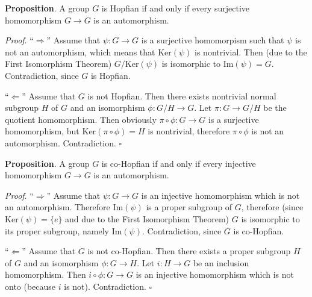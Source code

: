 \documentclass[12pt]{article}
\begin{document}
\textbf{Proposition}. A group $G$ is Hopfian if and only if every surjective homomorphism $G\to G$ is an automorphism.

\textit{Proof}. ``$\Rightarrow$'' Assume that $\psi:G\to G$ is a surjective homomorpism such that $\psi$ is not an automorphism, which means that $\mathrm{Ker}(\psi)$ is nontrivial. Then (due to the First Isomorphism Theorem) $G/\mathrm{Ker}(\psi)$ is isomorphic to $\mathrm{Im}(\psi)=G$. Contradiction, since $G$ is Hopfian.

``$\Leftarrow$'' Assume that $G$ is not Hopfian. Then there exists nontrivial normal subgroup $H$ of $G$ and an isomorphism $\phi:G/H\to G$. Let $\pi:G\to G/H$ be the quotient homomorphism. Then obviously $\pi\circ\phi:G\to G$ is a surjective homomorphism, but $\mathrm{Ker}(\pi\circ\phi)=H$ is nontrivial, therefore $\pi\circ\phi$ is not an automorphism. Contradiction. $\square$


\textbf{Proposition}. A group $G$ is co-Hopfian if and only if every injective homomorphism $G\to G$ is an automorphism.

\textit{Proof}. ``$\Rightarrow$'' Assume that $\psi:G\to G$ is an injective homomorphism which is not an automorphism. Therefore $\mathrm{Im}(\psi)$ is a proper subgroup of $G$, therefore (since $\mathrm{Ker}(\psi)=\{e\}$ and due to the First Isomorphism Theorem) $G$ is isomorphic to its proper subgroup, namely $\mathrm{Im}(\psi)$. Contradiction, since $G$ is co-Hopfian.

``$\Leftarrow$'' Assume that $G$ is not co-Hopfian. Then there exists a proper subgroup $H$ of $G$ and an isomorphism $\phi:G\to H$. Let $i:H\to G$ be an inclusion homomorphism. Then $i\circ\phi:G\to G$ is an injective homomorphism which is not onto (because $i$ is not). Contradiction. $\square$
\end{document}
